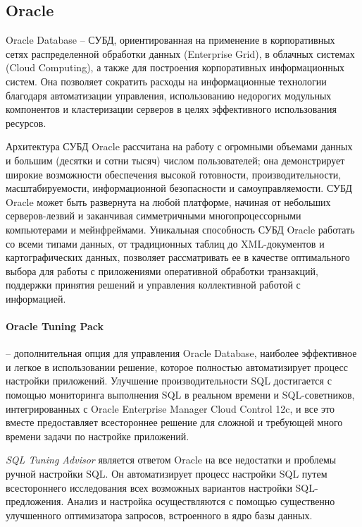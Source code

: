 \subsection{Oracle}

Oracle Database – СУБД, ориентированная на применение в корпоративных сетях распределенной обработки данных (Enterprise Grid), в облачных системах (Cloud Computing), а также для построения корпоративных информационных систем. Она позволяет сократить расходы на информационные технологии благодаря автоматизации управления, использованию недорогих модульных компонентов и кластеризации серверов в целях эффективного использования ресурсов. 

Архитектура СУБД Oracle рассчитана на работу с огромными объемами данных и большим (десятки и сотни тысяч) числом пользователей; она демонстрирует широкие возможности обеспечения высокой готовности, производительности, масштабируемости, информационной безопасности и самоуправляемости. СУБД Oracle может быть развернута на любой платформе, начиная от небольших серверов-лезвий и заканчивая симметричными многопроцессорными компьютерами и мейнфреймами. Уникальная способность СУБД Oracle работать со всеми типами данных, от традиционных таблиц до XML-документов и картографических данных, позволяет рассматривать ее в качестве оптимального выбора для работы с приложениями оперативной обработки транзакций, поддержки принятия решений и управления коллективной работой с информацией.  

\paragraph{Oracle Tuning Pack} – дополнительная опция для управления Oracle Database, наиболее эффективное и легкое в использовании решение, которое полностью автоматизирует процесс настройки приложений. Улучшение производительности SQL достигается с помощью мониторинга выполнения SQL в реальном времени и SQL-советников, интегрированных с Oracle Enterprise Manager Cloud Control 12c, и все это вместе предоставляет всестороннее решение для сложной и требующей много времени задачи по настройке приложений.

\textit{SQL Tuning Advisor} является ответом Oracle на все недостатки и проблемы ручной настройки SQL. Он автоматизирует процесс настройки SQL путем всестороннего исследования всех возможных вариантов настройки SQL-предложения. Анализ и настройка осуществляются с помощью существенно улучшенного оптимизатора запросов, встроенного в ядро базы данных.


